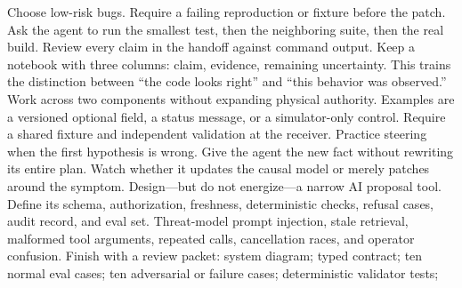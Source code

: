 \markdownRendererOlEnd \markdownRendererInterblockSeparator
{}
\markdownRendererSectionEnd \markdownRendererSectionBegin
{}\markdownRendererInterblockSeparator
{}Choose low-risk bugs. Require a failing reproduction or fixture before the\markdownRendererSoftLineBreak
{}patch. Ask the agent to run the smallest test, then the neighboring suite, then\markdownRendererSoftLineBreak
{}the real build. Review every claim in the handoff against command output.\markdownRendererParagraphSeparator
{}Keep a notebook with three columns: claim, evidence, remaining uncertainty.\markdownRendererSoftLineBreak
{}This trains the distinction between “the code looks right” and “this behavior\markdownRendererSoftLineBreak
{}was observed.”\markdownRendererInterblockSeparator
{}
\markdownRendererSectionEnd \markdownRendererSectionBegin
{}\markdownRendererInterblockSeparator
{}Work across two components without expanding physical authority. Examples are\markdownRendererSoftLineBreak
{}a versioned optional field, a status message, or a simulator-only control.\markdownRendererSoftLineBreak
{}Require a shared fixture and independent validation at the receiver.\markdownRendererParagraphSeparator
{}Practice steering when the first hypothesis is wrong. Give the agent the new\markdownRendererSoftLineBreak
{}fact without rewriting its entire plan. Watch whether it updates the causal\markdownRendererSoftLineBreak
{}model or merely patches around the symptom.\markdownRendererInterblockSeparator
{}
\markdownRendererSectionEnd \markdownRendererSectionBegin
{}\markdownRendererInterblockSeparator
{}Design—but do not energize—a narrow AI proposal tool. Define its schema,\markdownRendererSoftLineBreak
{}authorization, freshness, deterministic checks, refusal cases, audit record,\markdownRendererSoftLineBreak
{}and eval set. Threat-model prompt injection, stale retrieval, malformed tool\markdownRendererSoftLineBreak
{}arguments, repeated calls, cancellation races, and operator confusion.\markdownRendererParagraphSeparator
{}Finish with a review packet:\markdownRendererInterblockSeparator
{}\markdownRendererUlBegin
\markdownRendererUlItem system diagram;\markdownRendererUlItemEnd 
\markdownRendererUlItem typed contract;\markdownRendererUlItemEnd 
\markdownRendererUlItem ten normal eval cases;\markdownRendererUlItemEnd 
\markdownRendererUlItem ten adversarial or failure cases;\markdownRendererUlItemEnd 
\markdownRendererUlItem deterministic validator tests;\markdownRendererUlItemEnd 
